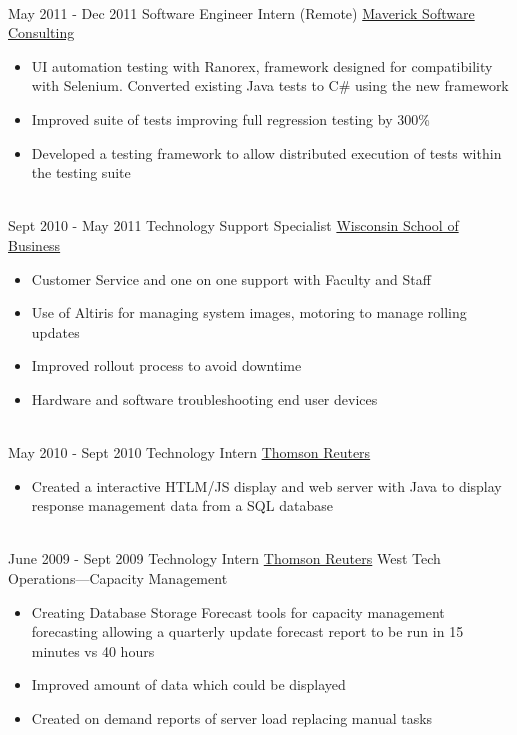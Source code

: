 \documentclass[letterpaper]{twentysecondcv} %
\begin{document}
\begin{twenty}
{\begin{itemize}
\end{itemize}}
        \\
	\twentyitem
		{May 2011 -}
		{Dec 2011}
        {Software Engineer Intern (Remote)}
        {\href{http://www.mavericksoftware.com/}{Maverick Software Consulting}}
        {}
        {
        {\begin{itemize}
        \item UI automation testing with Ranorex, framework designed for compatibility with Selenium. Converted existing Java tests to C\# using the new framework
        \item Improved suite of tests improving full regression testing by 300\%
        
        \item Developed a testing framework to allow distributed execution of tests within the testing suite
        
    \end{itemize}}
        }
    \\   
    \twentyitem
   		{Sept 2010 -}
		{May 2011}
        {Technology Support Specialist}
        {\href{https://wsb.wisc.edu/}{Wisconsin School of Business}}
        {}
        {
        {\begin{itemize}
		\item Customer Service and one on one support with Faculty and Staff
		\item Use of Altiris for managing system images, motoring to manage rolling updates
		\item Improved rollout process to avoid downtime
		\item Hardware and software troubleshooting end user devices
    \end{itemize}}
        }
     \\
     \twentyitem
	    {May 2010 -}
	    {Sept 2010}
	   	{Technology Intern}
        {\href{https://www.thomsonreuters.com}{Thomson Reuters}}
        {}
        {
        \begin{itemize}
        \item Created a interactive HTLM/JS display and web server with Java to display response management data from a SQL database
        
    \end{itemize}
    	}
    \\
    \twentyitem
	   {June 2009 -}
	   {Sept 2009}
       {Technology Intern}
       {\href{https://www.thomsonreuters.com}{Thomson Reuters}}
       {West Tech Operations—Capacity Management}
       {
       	\begin{itemize}
	\item Creating Database Storage Forecast tools for capacity management forecasting allowing a quarterly update forecast report to be run in 15 minutes vs 40 hours
	\item Improved amount of data which could be displayed
	\item Created on demand reports of server load replacing manual tasks
       		
       	\end{itemize}
       } 
\end{twenty}
\end{document}
